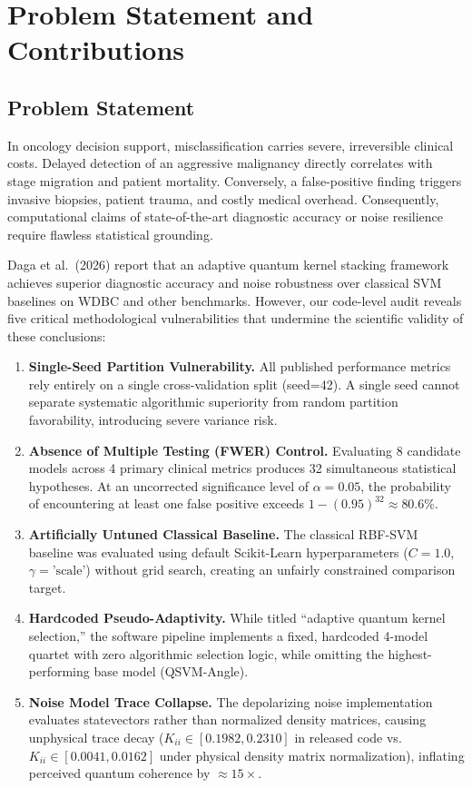 \documentclass[journal,twocolumn]{IEEEtran}
\begin{document}
\section{Problem Statement and Contributions}
\label{sec:problem}

\subsection{Problem Statement}

In oncology decision support, misclassification carries severe, irreversible clinical costs. Delayed detection of an aggressive malignancy directly correlates with stage migration and patient mortality. Conversely, a false-positive finding triggers invasive biopsies, patient trauma, and costly medical overhead. Consequently, computational claims of state-of-the-art diagnostic accuracy or noise resilience require flawless statistical grounding.

Daga et al.\ (2026) \cite{daga2026adaptive} report that an adaptive quantum kernel stacking framework achieves superior diagnostic accuracy and noise robustness over classical SVM baselines on WDBC and other benchmarks. However, our code-level audit reveals five critical methodological vulnerabilities that undermine the scientific validity of these conclusions:

\begin{enumerate}
    \item \textbf{Single-Seed Partition Vulnerability.} All published performance metrics rely entirely on a single cross-validation split (seed=42). A single seed cannot separate systematic algorithmic superiority from random partition favorability, introducing severe variance risk.
    \item \textbf{Absence of Multiple Testing (FWER) Control.} Evaluating 8 candidate models across 4 primary clinical metrics produces 32 simultaneous statistical hypotheses. At an uncorrected significance level of $\alpha = 0.05$, the probability of encountering at least one false positive exceeds $1 - (0.95)^{32} \approx 80.6\%$.
    \item \textbf{Artificially Untuned Classical Baseline.} The classical RBF-SVM baseline was evaluated using default Scikit-Learn hyperparameters ($C=1.0$, $\gamma=\text{'scale'}$) without grid search, creating an unfairly constrained comparison target.
    \item \textbf{Hardcoded Pseudo-Adaptivity.} While titled ``adaptive quantum kernel selection,'' the software pipeline implements a fixed, hardcoded 4-model quartet with zero algorithmic selection logic, while omitting the highest-performing base model (QSVM-Angle).
    \item \textbf{Noise Model Trace Collapse.} The depolarizing noise implementation evaluates statevectors rather than normalized density matrices, causing unphysical trace decay ($K_{ii} \in [0.1982, 0.2310]$ in released code vs.\ $K_{ii} \in [0.0041, 0.0162]$ under physical density matrix normalization), inflating perceived quantum coherence by $\approx 15\times$.
\end{enumerate}
\end{document}
